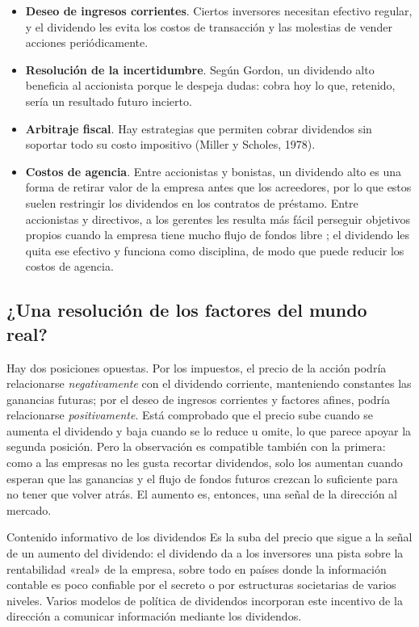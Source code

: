 \begin{itemize}
\item \textbf{Deseo de ingresos corrientes}. Ciertos inversores necesitan efectivo regular, y el dividendo les evita los costos de transacción y las molestias de vender acciones periódicamente.
\item \textbf{Resolución de la incertidumbre}. Según Gordon, un dividendo alto beneficia al accionista porque le despeja dudas: cobra hoy lo que, retenido, sería un resultado futuro incierto.
\item \textbf{Arbitraje fiscal}. Hay estrategias que permiten cobrar dividendos sin soportar todo su costo impositivo (Miller y Scholes, 1978).
\item \textbf{Costos de agencia}. Entre accionistas y bonistas, un dividendo alto es una forma de retirar valor de la empresa antes que los acreedores, por lo que estos suelen restringir los dividendos en los contratos de préstamo. Entre accionistas y directivos, a los gerentes les resulta más fácil perseguir objetivos propios cuando la empresa tiene mucho flujo de fondos libre ; el dividendo les quita ese efectivo y funciona como disciplina, de modo que puede reducir los costos de agencia.
\end{itemize}

\subsection{¿Una resolución de los factores del mundo real?}

Hay dos posiciones opuestas. Por los impuestos, el precio de la acción podría relacionarse \emph{negativamente} con el dividendo corriente, manteniendo constantes las ganancias futuras; por el deseo de ingresos corrientes y factores afines, podría relacionarse \emph{positivamente}. Está comprobado que el precio sube cuando se aumenta el dividendo y baja cuando se lo reduce u omite, lo que parece apoyar la segunda posición. Pero la observación es compatible también con la primera: como a las empresas no les gusta recortar dividendos, solo los aumentan cuando esperan que las ganancias y el flujo de fondos futuros crezcan lo suficiente para no tener que volver atrás. El aumento es, entonces, una señal de la dirección al mercado.

\begin{definicion}{Contenido informativo de los dividendos}
Es la suba del precio que sigue a la señal de un aumento del dividendo: el dividendo da a los inversores una pista sobre la rentabilidad «real» de la empresa, sobre todo en países donde la información contable es poco confiable por el secreto o por estructuras societarias de varios niveles. Varios modelos de política de dividendos incorporan este incentivo de la dirección a comunicar información mediante los dividendos.
\end{definicion}

